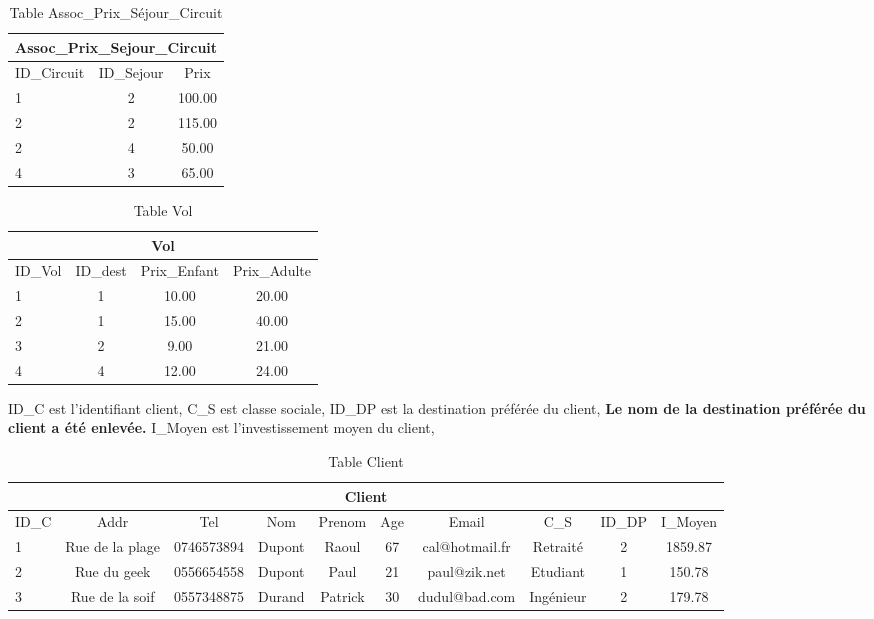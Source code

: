 \begin{table}[h]
\begin{center}
\begin{tabular}{|l|c|c|}
\hline
\multicolumn{3}{|c|}{Assoc\_Prix\_Sejour\_Circuit}\\
\hline
ID\_Circuit& ID\_Sejour & Prix\\
\hline
1 & 2& 100.00\\
\hline
2 & 2& 115.00\\
\hline
2 & 4& 50.00\\
\hline
4 & 3& 65.00\\
\hline
\end{tabular}
\end{center}
\caption{Table Assoc\_Prix\_S\'ejour\_Circuit}
\end{table}
\newpage

\begin{table}[h]
\begin{center}
\begin{tabular}{|l|c|c|c|}
\hline
\multicolumn{4}{|c|}{Vol}\\
\hline
ID\_Vol& ID\_dest & Prix\_Enfant& Prix\_Adulte\\
\hline
1 & 1& 10.00 & 20.00\\
\hline
2 & 1& 15.00& 40.00\\
\hline
3 & 2& 9.00& 21.00\\
\hline
4 & 4& 12.00& 24.00\\
\hline
\end{tabular}
\end{center}
\caption{Table Vol}
\end{table}


\begin{table}[h]
ID\_C est l'identifiant client,
C\_S est classe sociale,
ID\_DP est la destination pr\'ef\'er\'ee du client,
\textbf{Le nom de la destination pr\'ef\'er\'ee du client a \'et\'e enlev\'ee.}
I\_Moyen est l'investissement moyen du client,
\bigskip

\begin{tabular}{|l|c|c|c|c|c|c|c|c|c|}
\hline
\multicolumn{10}{|c|}{Client}\\
\hline
ID\_C& Addr& Tel & Nom & Prenom & Age & Email&C\_S & ID\_DP &I\_Moyen\\
\hline
1 &Rue de la plage&0746573894&Dupont&Raoul&67 &cal@hotmail.fr&Retrait\'e&2&1859.87\\
\hline
2 &Rue du geek&0556654558&Dupont&Paul&21 &paul@zik.net&Etudiant&1&150.78\\
\hline
3 &Rue de la soif&0557348875&Durand&Patrick&30 &dudul@bad.com&Ing\'enieur&2&179.78\\
\hline
\end{tabular}
\caption{Table Client}
\end{table}

